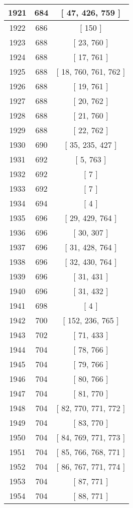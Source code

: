 \begin{center}
\begin{longtable}[H]{|| c c c ||}
\hline
1921 & 684 & [ 47, 426, 759 ] \\ 
\hline
1922 & 686 & [ 150 ] \\ 
\hline
1923 & 688 & [ 23, 760 ] \\ 
\hline
1924 & 688 & [ 17, 761 ] \\ 
\hline
1925 & 688 & [ 18, 760, 761, 762 ] \\ 
\hline
1926 & 688 & [ 19, 761 ] \\ 
\hline
1927 & 688 & [ 20, 762 ] \\ 
\hline
1928 & 688 & [ 21, 760 ] \\ 
\hline
1929 & 688 & [ 22, 762 ] \\ 
\hline
1930 & 690 & [ 35, 235, 427 ] \\ 
\hline
1931 & 692 & [ 5, 763 ] \\ 
\hline
1932 & 692 & [ 7 ] \\ 
\hline
1933 & 692 & [ 7 ] \\ 
\hline
1934 & 694 & [ 4 ] \\ 
\hline
1935 & 696 & [ 29, 429, 764 ] \\ 
\hline
1936 & 696 & [ 30, 307 ] \\ 
\hline
1937 & 696 & [ 31, 428, 764 ] \\ 
\hline
1938 & 696 & [ 32, 430, 764 ] \\ 
\hline
1939 & 696 & [ 31, 431 ] \\ 
\hline
1940 & 696 & [ 31, 432 ] \\ 
\hline
1941 & 698 & [ 4 ] \\ 
\hline
1942 & 700 & [ 152, 236, 765 ] \\ 
\hline
1943 & 702 & [ 71, 433 ] \\ 
\hline
1944 & 704 & [ 78, 766 ] \\ 
\hline
1945 & 704 & [ 79, 766 ] \\ 
\hline
1946 & 704 & [ 80, 766 ] \\ 
\hline
1947 & 704 & [ 81, 770 ] \\ 
\hline
1948 & 704 & [ 82, 770, 771, 772 ] \\ 
\hline
1949 & 704 & [ 83, 770 ] \\ 
\hline
1950 & 704 & [ 84, 769, 771, 773 ] \\ 
\hline
1951 & 704 & [ 85, 766, 768, 771 ] \\ 
\hline
1952 & 704 & [ 86, 767, 771, 774 ] \\ 
\hline
1953 & 704 & [ 87, 771 ] \\ 
\hline
1954 & 704 & [ 88, 771 ] \\ 

\end{longtable}
\end{center}
